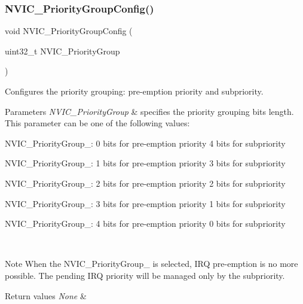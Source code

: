 \subsubsection{\texorpdfstring{N\+V\+I\+C\+\_\+\+Priority\+Group\+Config()}{NVIC\_PriorityGroupConfig()}}
{\footnotesize\ttfamily void N\+V\+I\+C\+\_\+\+Priority\+Group\+Config (\begin{DoxyParamCaption}\item[{uint32\+\_\+t}]{N\+V\+I\+C\+\_\+\+Priority\+Group }\end{DoxyParamCaption})}



Configures the priority grouping\+: pre-\/emption priority and subpriority. 


\begin{DoxyParams}{Parameters}
{\em N\+V\+I\+C\+\_\+\+Priority\+Group} & specifies the priority grouping bits length. This parameter can be one of the following values\+: \begin{DoxyItemize}
\item N\+V\+I\+C\+\_\+\+Priority\+Group\+\_\+: 0 bits for pre-\/emption priority 4 bits for subpriority \item N\+V\+I\+C\+\_\+\+Priority\+Group\+\_\+: 1 bits for pre-\/emption priority 3 bits for subpriority \item N\+V\+I\+C\+\_\+\+Priority\+Group\+\_\+: 2 bits for pre-\/emption priority 2 bits for subpriority \item N\+V\+I\+C\+\_\+\+Priority\+Group\+\_\+: 3 bits for pre-\/emption priority 1 bits for subpriority \item N\+V\+I\+C\+\_\+\+Priority\+Group\+\_\+: 4 bits for pre-\/emption priority 0 bits for subpriority \end{DoxyItemize}
\\
\hline
\end{DoxyParams}
\begin{DoxyNote}{Note}
When the N\+V\+I\+C\+\_\+\+Priority\+Group\+\_ is selected, I\+RQ pre-\/emption is no more possible. The pending I\+RQ priority will be managed only by the subpriority. 
\end{DoxyNote}

\begin{DoxyRetVals}{Return values}
{\em None} & \\
\hline
\end{DoxyRetVals}
\mbox{\label{group___m_i_s_c___private___functions_ga1145208ad70edfc2fab19b8b8ef1b1a1}} 

